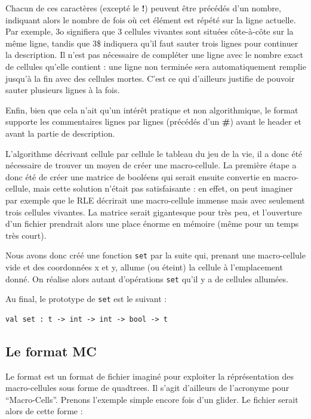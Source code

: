 \documentclass[a4paper,12pt]{report}
\begin{document}
Chacun de ces caractères (excepté le \textbf{!}) peuvent être précédés
d'un nombre, indiquant alors le nombre de fois où cet élément est
répété sur la ligne actuelle. Par exemple, 3o signifiera que 3
cellules vivantes sont situées côte-à-côte sur la même ligne, tandis
que 3\$ indiquera qu'il faut sauter trois lignes pour continuer la
description. Il n'est pas nécessaire de compléter une ligne avec le
nombre exact de cellules qu'elle contient : une ligne non terminée
sera automatiquement remplie jusqu'à la fin avec des cellules
mortes. C'est ce qui d'ailleurs justifie de pouvoir sauter plusieurs
lignes à la fois.

Enfin, bien que cela n'ait qu'un intérêt pratique et non algorithmique, le
format supporte les commentaires lignes par lignes (précédés d'un \textbf{\#}) 
avant le header et avant la partie de description.

\medskip

L'algorithme décrivant cellule par cellule le tableau du jeu de la vie, il a
donc été nécessaire de trouver un moyen de créer une macro-cellule. La première
étape a donc été de créer une matrice de booléens qui serait ensuite convertie
en macro-cellule, mais cette solution n'était pas satisfaisante : en effet, on
peut imaginer par exemple que le RLE décrirait une macro-cellule immense mais
avec seulement trois cellules vivantes. La matrice serait gigantesque pour très
peu, et l'ouverture d'un fichier prendrait alors une place énorme en mémoire
(même pour un temps très court).

Nous avons donc créé une fonction \texttt{set} par la suite qui, prenant une
macro-cellule vide et des coordonnées x et y, allume (ou éteint) la
cellule à l'emplacement donné. On réalise alors autant d'opérations \texttt{set}
qu'il y a de cellules allumées.

Au final, le prototype de \texttt{set} est le suivant :
\begin{verbatim}
val set : t -> int -> int -> bool -> t
\end{verbatim}


\subsection{Le format MC}
Le format est un format de fichier imaginé pour exploiter la réprésentation des
macro-cellules sous forme de quadtrees. Il s'agit d'ailleurs de l'acronyme pour
``Macro-Cells''.  Prenons l'exemple simple encore fois d'un glider. Le fichier
serait alors de cette forme :
\end{document}
